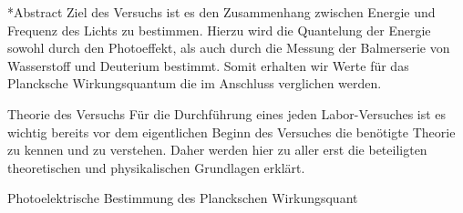 \documentclass[pdftex, a4paper,11pt, twoside, ngerman]{report}
\begin{document}
  
  
  \begin{chapter}*{Abstract}
    Ziel des Versuchs ist es den Zusammenhang zwischen Energie und Frequenz des
    Lichts zu bestimmen. Hierzu wird die Quantelung der Energie sowohl durch
    den Photoeffekt, als auch durch die Messung der Balmerserie von
    Wasserstoff und Deuterium bestimmt. Somit erhalten wir Werte für das
    Plancksche Wirkungsquantum die im Anschluss verglichen werden.
  \end{chapter}
  
  \tableofcontents
  
  
  
  \begin{chapter}{Theorie des Versuchs}
    \label{chp:Theorie}
    Für die Durchführung eines jeden Labor-Versuches ist es wichtig bereits vor
    dem eigentlichen Beginn des Versuches die benötigte Theorie zu kennen und
    zu verstehen. Daher werden hier zu aller erst die beteiligten
    theoretischen und physikalischen Grundlagen erklärt.
   
   
   
    \begin{section}{Photoelektrische Bestimmung des Planckschen Wirkungsquant}
      \label{chp:TheoriePhotoelektrischesWirkungsquantum}
     
     
     

\end{section}
\end{chapter}
\end{document}
